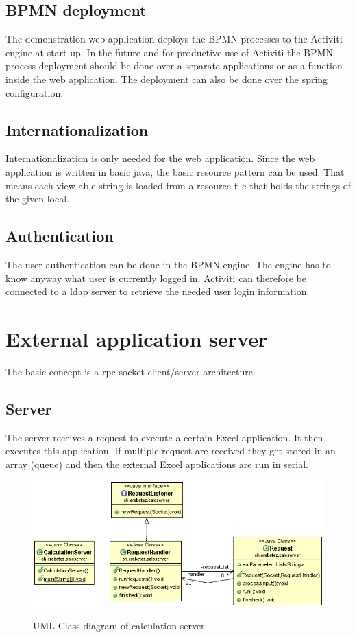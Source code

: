 \documentclass[paper=a4,twoside=false,BCOR=0mm,DIV=calc,fontsize=12pt]{scrartcl}
\begin{document}
\subsection{BPMN deployment}
The demonstration web application deploys the BPMN processes to the Activiti engine at start up. In the future and for productive use of Activiti the
BPMN process deployment should be done over a separate applications or as a function inside the web application. 
The deployment can also be done over the spring configuration.

\subsection{Internationalization}
Internationalization is only needed for the web application. Since the web application is written in basic java, the basic resource pattern can be used. That means each view able string is loaded from a resource file that holds the strings of the given local. 



\subsection{Authentication}
The user authentication can be done in the BPMN engine. The engine has to know anyway what user is currently logged in. Activiti can therefore be connected to a ldap server to retrieve the needed user login information.



\section{External application server}
The basic concept is a rpc socket client/server architecture. \cite{rpc}

\subsection{Server}
The server receives a request to execute a certain Excel application. It then executes this application. If multiple request are received they get stored in an array (queue) and then the external Excel applications are run in serial. 

\begin{figure}
    \begin{center}
       \includegraphics[width=1\textwidth]{./img/calcServerUML.png}\\
    \end{center}
  \caption{UML Class diagram of calculation server}
  \label{uml_calculationserver}
\end{figure} 
\end{document}

